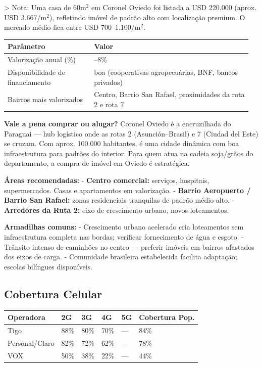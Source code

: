 > Nota: Uma casa de 60m$^2$ em Coronel Oviedo foi listada a USD 220.000 (aprox. USD 3.667/m$^2$), refletindo imóvel de padrão alto com localização premium. O mercado médio fica entre USD 700--1.100/m$^2$.


{\small
\setlength{\tabcolsep}{3pt}
\renewcommand{\arraystretch}{1.12}
\begin{tabularx}{\linewidth}{>{\raggedright\arraybackslash}p{0.34\linewidth} >{\raggedright\arraybackslash}p{0.62\linewidth}}
\toprule
Parâmetro & Valor \\
\midrule
Valorização anual (\%) & 6--8\% \\
Disponibilidade de financiamento & boa (cooperativas agropecuárias, BNF, bancos privados) \\
Bairros mais valorizados & Centro, Barrio San Rafael, proximidades da rota 2 e rota 7 \\
\bottomrule
\end{tabularx}
}


\textbf{Vale a pena comprar ou alugar?}
Coronel Oviedo é a encruzilhada do Paraguai --- hub logístico onde as rotas 2 (Asunción--Brasil) e 7 (Ciudad del Este) se cruzam. Com aprox. 100.000 habitantes, é uma cidade dinâmica com boa infraestrutura para padrões do interior. Para quem atua na cadeia soja/grãos do departamento, a compra de imóvel em Oviedo é estratégica.

\textbf{Áreas recomendadas:}
- \textbf{Centro comercial:} serviços, hospitais, supermercados. Casas e apartamentos em valorização.
- \textbf{Barrio Aeropuerto / Barrio San Rafael:} zonas residenciais tranquilas de padrão médio-alto.
- \textbf{Arredores da Ruta 2:} eixo de crescimento urbano, novos loteamentos.

\textbf{Armadilhas comuns:}
- Crescimento urbano acelerado cria loteamentos sem infraestrutura completa nas bordas; verificar fornecimento de água e esgoto.
- Trânsito intenso de caminhões no centro --- preferir imóveis em bairros afastados dos eixos de carga.
- Comunidade brasileira estabelecida facilita adaptação; escolas bilíngues disponíveis.




\subsection{Cobertura Celular}



{\small
\setlength{\tabcolsep}{3pt}
\renewcommand{\arraystretch}{1.12}
{\small
\begin{tabularx}{\linewidth}{lXXXXX}
\toprule
Operadora & 2G & 3G & 4G & 5G & Cobertura Pop. \\
\midrule
Tigo & 88\% & 80\% & 70\% & --- & 84\% \\
Personal/Claro & 82\% & 72\% & 62\% & --- & 78\% \\
VOX & 50\% & 38\% & 22\% & --- & 44\% \\
\bottomrule
\end{tabularx}
}
}

